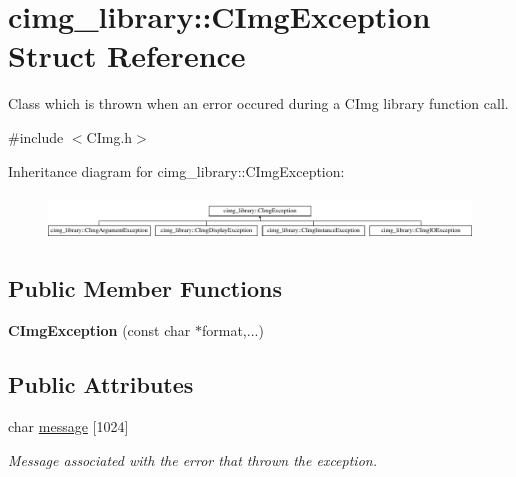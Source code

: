 \hypertarget{structcimg__library_1_1_c_img_exception}{
\section{cimg\_\-library::CImgException Struct Reference}
\label{structcimg__library_1_1_c_img_exception}
}


Class which is thrown when an error occured during a CImg library function call.  




{\ttfamily \#include $<$CImg.h$>$}

Inheritance diagram for cimg\_\-library::CImgException:\begin{figure}[H]
\begin{center}
\leavevmode
\includegraphics[height=1.201717cm]{structcimg__library_1_1_c_img_exception}
\end{center}
\end{figure}
\subsection*{Public Member Functions}
\begin{DoxyCompactItemize}
\item 
\hypertarget{structcimg__library_1_1_c_img_exception_af363fbdd7832f611d3da5c14befe2d25}{
{\bfseries CImgException} (const char $\ast$format,...)}
\label{structcimg__library_1_1_c_img_exception_af363fbdd7832f611d3da5c14befe2d25}

\end{DoxyCompactItemize}
\subsection*{Public Attributes}
\begin{DoxyCompactItemize}
\item 
\hypertarget{structcimg__library_1_1_c_img_exception_a0d6ea22499e9e0fd52c5995ecb99cba2}{
char \hyperlink{structcimg__library_1_1_c_img_exception_a0d6ea22499e9e0fd52c5995ecb99cba2}{message} \mbox{[}1024\mbox{]}}
\label{structcimg__library_1_1_c_img_exception_a0d6ea22499e9e0fd52c5995ecb99cba2}

\begin{DoxyCompactList}\small\item\em Message associated with the error that thrown the exception. \item\end{DoxyCompactList}\end{DoxyCompactItemize}



